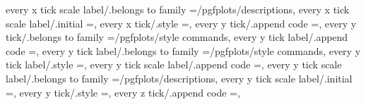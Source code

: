 {{{{{{{{{{{{{{{every x tick scale label/.belongs to family                        =/pgfplots/descriptions,                                                                                                            
every x tick scale label/.initial                                  =,%
every x tick/.style                                                ={},                                                                                                                                
every y tick/.append code                                          ={},                                                                               
every y tick/.belongs to family                                    =/pgfplots/style commands,                                                                                                          
every y tick label/.append code                                    ={},                                                                         
every y tick label/.belongs to family                              =/pgfplots/style commands,                                                                                                          
every y tick label/.style                                          ={},                                                                                                                                
every y tick scale label/.append code                              ={},                                                                   
every y tick scale label/.belongs to family                        =/pgfplots/descriptions,                                                                                                            
every y tick scale label/.initial                                  =,%
every y tick/.style                                                ={},                                                                                                                                
every z tick/.append code                                          ={},                                                                               
}}}}}}}}}}}}}}}
